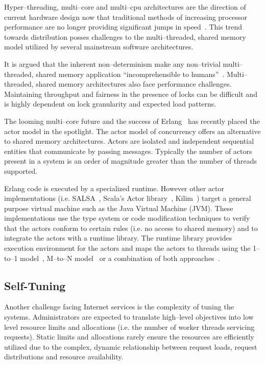 \documentclass[conference]{IEEEtran}
\begin{document}
Hyper--threading, multi--core and multi--cpu architectures are the direction of current hardware design now that traditional methods of increasing processor performance are no longer providing significant jumps in speed~\cite{Sutter05Concurrency}. This trend towards distribution posses challenges to the multi--threaded, shared memory model utilized by several mainstream software architectures.

It is argued that  the inherent non--determinism make any non--trivial multi--threaded, shared memory application ``incomprehensible to humans''~\cite{Lee06ThreadProblems}. Multi--threaded, shared memory architectures also face performance challenges. Maintaining throughput and fairness in the presence of locks can be difficult and is highly dependent on lock granularity and expected load patterns.

The looming multi--core future and the success of Erlang~\cite{armstrong96erlang} has recently placed the actor model in the spotlight. The actor model of concurrency offers an alternative to shared memory architectures. Actors are isolated and independent sequential entities that communicate by passing messages. Typically the number of actors present in a system is an order of magnitude greater than the number of threads supported.

Erlang code is executed by a specialized runtime. However other actor implementations (i.e. SALSA~\cite{Varela:SALSA}, Scala's Actor library~\cite{Haller:07:ScalaActors}, Kilim~\cite{Srinivasan:08:Kilim}) target a general purpose virtual machine such as the Java Virtual Machine (JVM). These implementations use the type system or code modification techniques to verify that the actors conform to certain rules (i.e. no access to shared memory) and to integrate the actors with a runtime library. The runtime library provides execution environment for the actors and maps the actors to threads using the 1--to--1 model~\cite{Varela:SALSA}, M--to--N model~\cite{Srinivasan:08:Kilim,armstrong96erlang} or a combination of both approaches~\cite{Haller:07:ScalaActors}.

\subsection{Self-Tuning}

Another challenge facing Internet services is the complexity of tuning the systems. Administrators are expected to translate high--level objectives into low level resource limits and allocations (i.e. the number of worker threads servicing requests). Static limits and allocations rarely ensure the resources are efficiently utilized due to the complex, dynamic relationship between request loads, request distributions and resource availability. 
\end{document}
